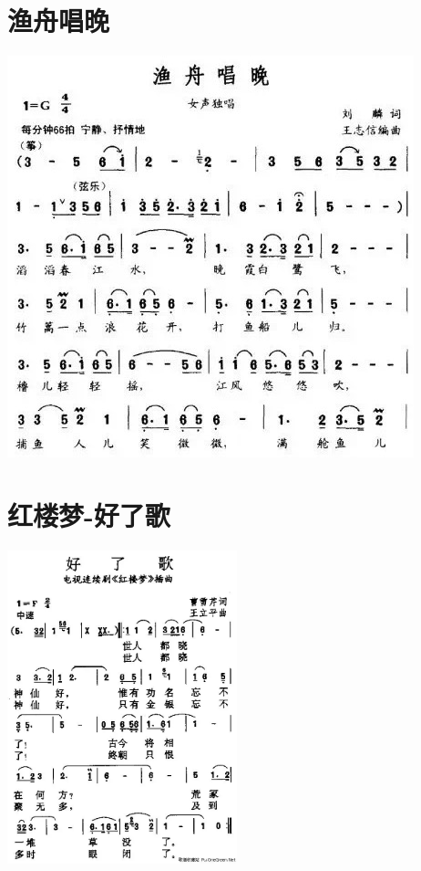 \documentclass[cn,pad,twocol]{elegantbook}
\begin{document}
\section{渔舟唱晚}\includegraphics[width=\textwidth]{dongxiao/20200819/渔舟唱晚.jpeg}
\section{红楼梦-好了歌}\includegraphics[width=0.5\textwidth]{dongxiao/20200819/红楼梦-好了歌.jpeg}
\end{document}
